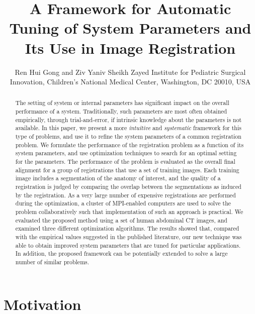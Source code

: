 \documentclass[]{spie}  %
\title{A Framework for Automatic Tuning of System Parameters and Its Use in Image Registration}
\author{Ren Hui Gong\supit{a} and Ziv Yaniv\supit{a}
\skiplinehalf
\supit{a}Sheikh Zayed Institute for Pediatric Surgical Innovation, Children's National Medical Center, Washington, DC 20010, USA
}
\begin{document}
 
\maketitle 

\begin{abstract}
The setting of system or internal parameters has significant impact on the overall performance of a system. Traditionally, such parameters are most often obtained empirically, through trial-and-error, if intrinsic knowledge about the parameters is not available. In this paper, we present a more \emph{intuitive} and \emph{systematic} framework for this type of problems, and use it to refine the system parameters of a common registration problem. We formulate the performance of the registration problem as a function of its system parameters, and use optimization techniques to search for an optimal setting for the parameters. The performance of the problem is evaluated as the overall final alignment for a group of registrations that use a set of training images. Each training image includes a segmentation of the anatomy of interest, and the quality of a registration is judged by comparing the overlap between the segmentations as induced by the registration. As a very large number of expensive registrations are performed during the optimization, a cluster of MPI-enabled computers are used to solve the problem collaboratively such that implementation of such an approach is practical. We evaluated the proposed method using a set of human abdominal CT images, and examined three different optimization algorithms. The results showed that, compared with the empirical values suggested in the published literature, our new technique was able to obtain improved system parameters that are tuned for particular applications. In addition, the proposed framework can be potentially extended to solve a large number of similar problems. 
\end{abstract}



\section{Motivation}
\end{document}
